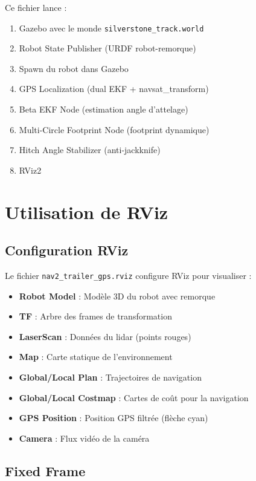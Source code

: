 \documentclass[a4paper,12pt]{article}
\begin{document}
Ce fichier lance :
\begin{enumerate}
    \item Gazebo avec le monde \texttt{silverstone\_track.world}
    \item Robot State Publisher (URDF robot-remorque)
    \item Spawn du robot dans Gazebo
    \item GPS Localization (dual EKF + navsat\_transform)
    \item Beta EKF Node (estimation angle d'attelage)
    \item Multi-Circle Footprint Node (footprint dynamique)
    \item Hitch Angle Stabilizer (anti-jackknife)
    \item RViz2
\end{enumerate}

\section{Utilisation de RViz}

\subsection{Configuration RViz}

Le fichier \texttt{nav2\_trailer\_gps.rviz} configure RViz pour visualiser :

\begin{itemize}
    \item \textbf{Robot Model} : Modèle 3D du robot avec remorque
    \item \textbf{TF} : Arbre des frames de transformation
    \item \textbf{LaserScan} : Données du lidar (points rouges)
    \item \textbf{Map} : Carte statique de l'environnement
    \item \textbf{Global/Local Plan} : Trajectoires de navigation
    \item \textbf{Global/Local Costmap} : Cartes de coût pour la navigation
    \item \textbf{GPS Position} : Position GPS filtrée (flèche cyan)
    \item \textbf{Camera} : Flux vidéo de la caméra
\end{itemize}

\subsection{Fixed Frame}
\end{document}
